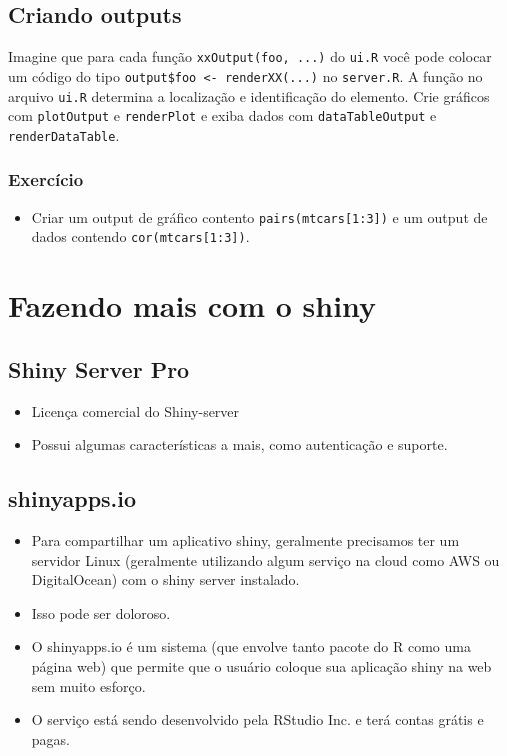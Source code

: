 \documentclass[]{book}
\providecommand{\tightlist}{%
  \setlength{\itemsep}{0pt}\setlength{\parskip}{0pt}}
\begin{document}
\subsection{Criando outputs}\label{criando-outputs}

Imagine que para cada função
\texttt{xxOutput(\textquotesingle{}foo\textquotesingle{},\ ...)} do
\texttt{ui.R} você pode colocar um código do tipo
\texttt{output\$foo\ \textless{}-\ renderXX(...)} no \texttt{server.R}.
A função no arquivo \texttt{ui.R} determina a localização e
identificação do elemento. Crie gráficos com \texttt{plotOutput} e
\texttt{renderPlot} e exiba dados com \texttt{dataTableOutput} e
\texttt{renderDataTable}.

\subsubsection{Exercício}\label{exercicio-1}

\begin{itemize}
\tightlist
\item
  Criar um output de gráfico contento \texttt{pairs(mtcars{[}1:3{]})} e
  um output de dados contendo \texttt{cor(mtcars{[}1:3{]})}.
\end{itemize}

\section{Fazendo mais com o shiny}\label{fazendo-mais-com-o-shiny}

\subsection{Shiny Server Pro}\label{shiny-server-pro}

\begin{itemize}
\tightlist
\item
  Licença comercial do Shiny-server
\item
  Possui algumas características a mais, como autenticação e suporte.
\end{itemize}

\subsection{shinyapps.io}\label{shinyapps.io}

\begin{itemize}
\tightlist
\item
  Para compartilhar um aplicativo shiny, geralmente precisamos ter um
  servidor Linux (geralmente utilizando algum serviço na cloud como AWS
  ou DigitalOcean) com o shiny server instalado.
\item
  Isso pode ser doloroso.
\item
  O shinyapps.io é um sistema (que envolve tanto pacote do R como uma
  página web) que permite que o usuário coloque sua aplicação shiny na
  web sem muito esforço.
\item
  O serviço está sendo desenvolvido pela RStudio Inc. e terá contas
  grátis e pagas.
\end{itemize}
\end{document}
